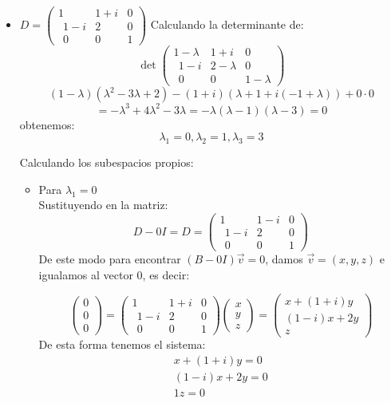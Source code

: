 \begin{itemize}
    
    
    
    
    
    
    \item $D=\begin{pmatrix}1&1+i&0\\ \:\:1-i&2&0\\ \:\:0&0&1\end{pmatrix}$
    Calculando la determinante de:
    $$\det \begin{pmatrix}1-\lambda&1+i&0\\ \:\:1-i&2-\lambda&0\\ \:\:0&0&1-\lambda\end{pmatrix}$$
    $$(1-\lambda)(\lambda^2-3\lambda+2)-(1+i)(\lambda+1+i(-1+\lambda))+0\cdot0$$
    $$=-\lambda^3+4\lambda^2-3\lambda=-\lambda(\lambda-1)(\lambda-3)=0$$
    obtenemos:
    $$\lambda_1=0, \lambda_2=1, \lambda_3=3$$
    
    
    
    
        Calculando los subespacios propios:
\begin{itemize}
    \item Para $\lambda_1=0$\\
        Sustituyendo en la matriz:
        \[D-0I=D=\begin{pmatrix}1&1-i&0\\ \:\:1-i&2&0\\ \:\:0&0&1\end{pmatrix}\]
        De este modo para encontrar $(B-0I)\Vec{v}=0$, damos $\vec{v}=(x,y,z)$ e igualamos al vector 0, es decir:
        
        
        \[\begin{pmatrix}0\\0\\0\end{pmatrix}=\begin{pmatrix}1&1+i&0\\ \:\:1-i&2&0\\ \:\:0&0&1\end{pmatrix}\begin{pmatrix}x\\y\\z\end{pmatrix}=\begin{pmatrix}x+(1+i)y\\ (1-i)x+2y\\ z\end{pmatrix}\]
        De esta forma tenemos el sistema:
        \begin{eqnarray*}
       x+(1+i)y=0\\ 
       (1-i)x+2y=0\\
       1z=0
        \end{eqnarray*}
        

\end{itemize}
\end{itemize}
